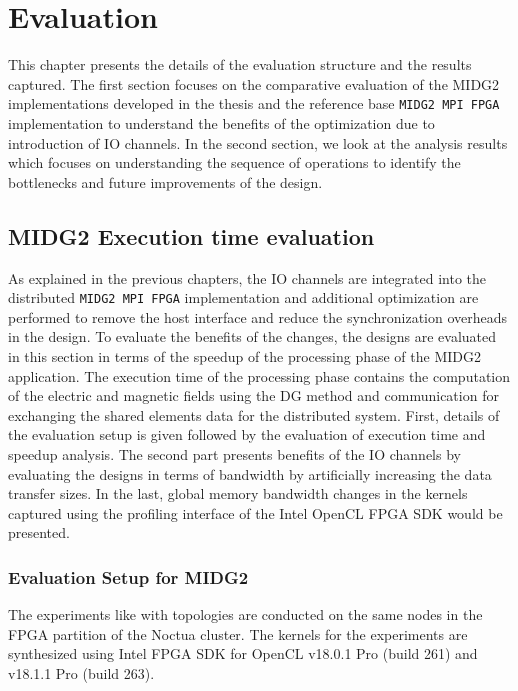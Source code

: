 \chapter{Evaluation}
\label{cha:Evaluation}

This chapter presents the details of the evaluation structure and the results
captured. The first section focuses on the comparative evaluation of
the MIDG2 implementations developed in the thesis and the reference base \texttt{MIDG2
MPI FPGA} implementation to understand the benefits of the optimization due to introduction
of IO channels. In the second section, we look at the analysis results which
focuses on understanding the sequence of operations to identify the bottlenecks
and future improvements of the design.


\section{MIDG2 Execution time evaluation}

As explained in the previous chapters, the IO channels are integrated into the
distributed \texttt{MIDG2 MPI FPGA} implementation and additional optimization are performed
to remove the host interface and reduce the synchronization overheads in the design.
To evaluate the benefits of the changes, the designs are evaluated in this section
in terms of the speedup of the processing phase of the MIDG2 application. The execution
time of the processing phase contains the computation of the electric
and magnetic fields using the \ac{DG} method and communication for exchanging the
shared elements data for the distributed system. First, details of the
evaluation setup is given followed by the evaluation of execution
time and speedup analysis. The second part presents benefits of the IO
channels by evaluating the designs in terms of bandwidth by artificially
increasing the data transfer sizes. In the last, global memory bandwidth
changes in the kernels captured using the profiling interface of the Intel
OpenCL FPGA SDK would be presented.

\subsection{Evaluation Setup for MIDG2}

The experiments like with topologies are conducted on the same
nodes in the FPGA partition of the Noctua cluster. The kernels
for the experiments are synthesized using Intel FPGA SDK for OpenCL
v18.0.1 Pro (build 261) and v18.1.1 Pro (build 263).

